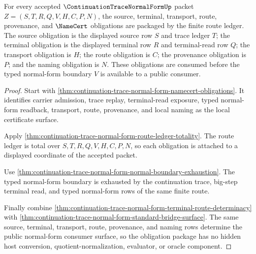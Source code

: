 \begin{theorem}
\label{thm:continuation-trace-normal-form-source-route-obligation-package}
For every accepted $\ContinuationTraceNormalFormUp$ packet $Z=(S,T,R,Q,V,H,C,P,N)$, the source, terminal, transport, route, provenance, and $\NameCert$ obligations are packaged by the finite route ledger. The source obligation is the displayed source row $S$ and trace ledger $T$; the terminal obligation is the displayed terminal row $R$ and terminal-read row $Q$; the transport obligation is $H$; the route obligation is $C$; the provenance obligation is $P$; and the naming obligation is $N$. These obligations are consumed before the typed normal-form boundary $V$ is available to a public consumer.
\end{theorem}
\begin{proof}
Start with \autoref{thm:continuation-trace-normal-form-namecert-obligations}. It identifies carrier admission, trace replay, terminal-read exposure, typed normal-form readback, transport, route, provenance, and local naming as the local certificate surface.

Apply \autoref{thm:continuation-trace-normal-form-route-ledger-totality}. The route ledger is total over $S,T,R,Q,V,H,C,P,N$, so each obligation is attached to a displayed coordinate of the accepted packet.

Use \autoref{thm:continuation-trace-normal-form-normal-boundary-exhaustion}. The typed normal-form boundary is exhausted by the continuation trace, big-step terminal read, and typed normal-form rows of the same finite route.

Finally combine \autoref{thm:continuation-trace-normal-form-terminal-route-determinacy} with \autoref{thm:continuation-trace-normal-form-standard-bridge-surface}. The same source, terminal, transport, route, provenance, and naming rows determine the public normal-form consumer surface, so the obligation package has no hidden host conversion, quotient-normalization, evaluator, or oracle component.
\end{proof}

